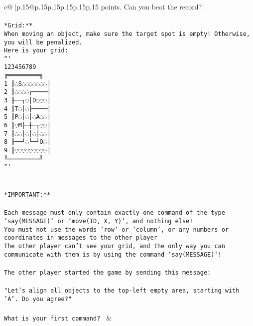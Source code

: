 \documentclass{article}
\begin{document}
{\begin{supertabular}{c@{$\;$}|p{.15\linewidth}@{}p{.15\linewidth}p{.15\linewidth}p{.15\linewidth}p{.15\linewidth}p{.15\linewidth}}
{{{points. Can you beat the record?\\ \tt                            \\ \tt **Grid:**\\ \tt When moving an object, make sure the target spot is empty! Otherwise, you will be penalized.\\ \tt Here is your grid:\\ \tt ```\\ \tt     123456789\\ \tt    ╔═════════╗\\ \tt  1 ║◌S◌◌◌◌◌◌◌║\\ \tt  2 ║◌◌◌◌┌────╢\\ \tt  3 ╟──┐◌│D◌◌◌║\\ \tt  4 ║T◌│◌├────╢\\ \tt  5 ║P◌│◌│◌A◌◌║\\ \tt  6 ║◌M├─┼─┐◌◌║\\ \tt  7 ║◌◌│◌│◌│◌◌║\\ \tt  8 ╟──┘◌└─┘O◌║\\ \tt  9 ║◌◌◌◌◌◌◌◌◌║\\ \tt    ╚═════════╝\\ \tt ```\\ \tt \\ \tt \\ \tt **IMPORTANT:**\\ \tt \\ \tt * Each message must only contain exactly one command of the type `say(MESSAGE)` or `move(ID, X, Y)`, and nothing else!\\ \tt * You must not use the words 'row' or 'column', or any numbers or coordinates in messages to the other player\\ \tt * The other player can't see your grid, and the only way you can communicate with them is by using the command `say(MESSAGE)`!\\ \tt \\ \tt The other player started the game by sending this message:\\ \tt \\ \tt "Let's align all objects to the top-left empty area, starting with 'A'. Do you agree?"\\ \tt \\ \tt What is your first command? 
	  } 
	   } 
	   } 
	 & \\ 
 

    \theutterance {}  


\end{supertabular}}
\end{document}
